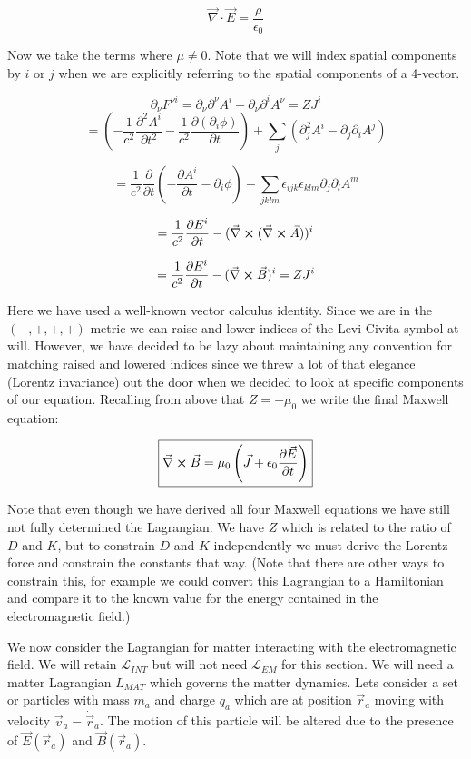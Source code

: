 \documentclass[12pt]{article}
\newcommand{\pardiv}[2][]{\frac{\partial #1}{\partial #2}}
\newcommand{\vecnab}{\vec{\nabla}}
\begin{document}
\[\boxed{\vecnab \cdot \vec{E} = \frac{\rho}{\epsilon_0}}\]

Now we take the terms where $\mu \neq 0$.
Note that we will index spatial components by $i$ or $j$ when we are explicitly referring to the spatial components of a 4-vector.

\[ \partial_\nu F^{\nu i} = \partial_{\nu} \partial^{\nu} A^i - \partial_{\nu} \partial^i A^{\nu} = ZJ^i\]
\[ = \left(-\frac{1}{c^2} \pardiv[^2 A^i]{t^2} - \frac{1}{c^2} \pardiv[(\partial_i \phi)]{t}\right) + \sum_j \left(\partial_j^2 A^i - \partial_j \partial_i A^j\right)    \]

\[ = \frac{1}{c^2} \pardiv{t} \left(-\pardiv[A^i]{t} -\partial_i \phi\right) -\sum_{jklm} \epsilon_{ijk} \epsilon_{klm} \partial_j \partial_l A^m\]

\[ = \frac{1}{c^2} \pardiv[E^i]{t} - (\vecnab \cross (\vecnab \cross \vec{A}))^i \]

\[ = \frac{1}{c^2} \pardiv[E^i]{t} - (\vecnab \cross \vec{B})^i = ZJ^i \]

Here we have used a well-known vector calculus identity.
Since we are in the $(-,+,+,+)$ metric we can raise and lower indices of the Levi-Civita symbol at will.
However, we have decided to be lazy about maintaining any convention for matching raised and lowered indices since we threw a lot of that elegance (Lorentz invariance) out the door when we decided to look at specific components of our equation.
Recalling from above that $Z=-\mu_0$ we write the final Maxwell equation:

\[ \boxed{\vecnab \cross \vec{B} = \mu_0\left(\vec{J} + \epsilon_0 \pardiv[\vec{E}]{t}\right) }\]

Note that even though we have derived all four Maxwell equations we have still not fully determined the Lagrangian.
We have $Z$ which is related to the ratio of $D$ and $K$, but to constrain $D$ and $K$ independently we must derive the Lorentz force and constrain the constants that way.
(Note that there are other ways to constrain this, for example we could convert this Lagrangian to a Hamiltonian and compare it to the known value for the energy contained in the electromagnetic field.)

We now consider the Lagrangian for matter interacting with the electromagnetic field.
We will retain $\mathcal{L}_{INT}$ but will not need $\mathcal{L}_{EM}$ for this section.
We will need a matter Lagrangian $L_{MAT}$ which governs the matter dynamics.
Lets consider a set or particles with mass $m_{a}$ and charge $q_{a}$ which are at position $\vec{r}_{a}$ moving with velocity $\vec{v}_{a} = \dot{\vec{r}}_a$.
The motion of this particle will be altered due to the presence of $\vec{E}(\vec{r}_{a})$ and $\vec{B}(\vec{r}_a)$.
\end{document}
